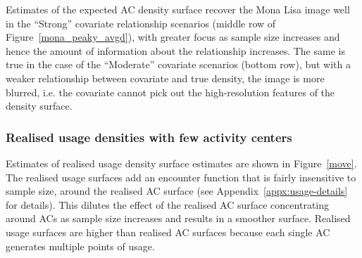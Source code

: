 \documentclass[10pt,a4paper]{article}
\begin{document}
Estimates of the expected AC density surface recover the Mona Lisa image well in the ``Strong'' covariate relationship scenarios (middle row of Figure~\ref{mona_peaky_avgd}), with greater focus as sample size increases and hence the amount of information about the relationship increases. The same is true in the case of the ``Moderate'' covariate scenarios (bottom row), but with a weaker relationship between covariate and true density, the image is more blurred, i.e. the covariate cannot pick out the high-resolution features of the density surface.

\subsubsection{Realised usage densities with few activity centers}

Estimates of realised usage density surface estimates are shown in Figure~\ref{move}. The realised usage surfaces add an encounter function that is fairly insensitive to sample size, around the realised AC surface (see Appendix~\ref{appx:usage-details} for details). This dilutes the effect of the realised AC surface concentrating around ACs as sample size increases and results in a smoother surface. Realised usage surfaces are higher than realised AC surfaces because each single AC generates multiple points of usage.

\end{document}
